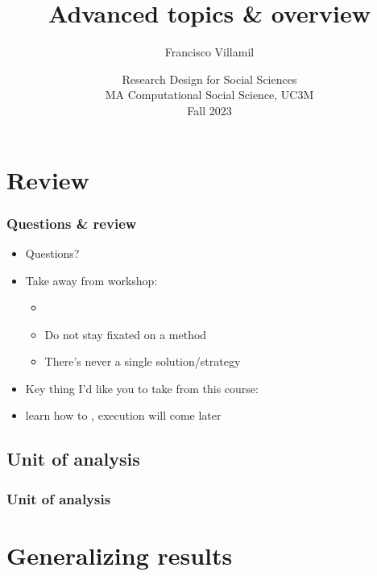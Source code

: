 \documentclass[aspectratio=43]{beamer}
\title[Lecture 5: Advanced topics]{\Large Advanced topics \& overview}
\author[]{Francisco Villamil}
\date[]{Research Design for Social Sciences\\MA Computational Social Science, UC3M\\Fall 2023}
\begin{document}

\begin{frame}
  \titlepage
\end{frame}

\section{Review}

\begin{frame}
\frametitle{Questions \& review}
\centering

\begin{itemize}
  \item Questions?
  \item<2-> Take away from workshop:
  \begin{itemize}
    \item {}
    \item Do not stay fixated on a method
    \item There's never a single solution/strategy
  \end{itemize}
  \item<3-> Key thing I'd like you to take from this course:
  \item<3->[] learn how to , execution will come later
\end{itemize}

\end{frame}

\subsection*{Unit of analysis}

\begin{frame}
\frametitle{Unit of analysis}
\centering



\end{frame}

\section{Generalizing results}
\end{document}

